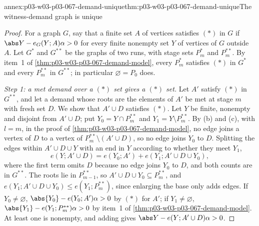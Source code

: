 \begin{annexitem}{annex:p03-w03-p03-067-demand-unique}{thm:p03-w03-p03-067-demand-unique}{The witness-demand graph is unique}
\begin{proof}
For a graph \(G\), say that a finite set \(A\) of vertices satisfies
\((\ast)\) in \(G\) if \(\abs Y-e_G(Y;A)\alpha>0\) for every finite nonempty
set \(Y\) of vertices of \(G\) outside \(A\).  Let \(G^\ast\) and \(G^{\ast\ast}\)
be the graphs of two runs, with stage sets \(P^\ast_m\) and
\(P^{\ast\ast}_m\).  By item~1 of \cref{thm:p03-w03-p03-067-demand-model},
every \(P^\ast_m\) satisfies \((\ast)\) in \(G^\ast\) and every
\(P^{\ast\ast}_m\) in \(G^{\ast\ast}\); in particular \(\varnothing=P_0\) does.

\emph{Step 1: a met demand over a \((\ast)\) set gives a \((\ast)\) set.}  Let
\(A'\) satisfy \((\ast)\) in \(G^{\ast\ast}\), and let a demand whose roots
are the elements of \(A'\) be met at stage \(m\) with fresh set \(D\).  We
show that \(A'\cup D\) satisfies \((\ast)\).  Let \(Y\) be finite, nonempty
and disjoint from \(A'\cup D\); put \(Y_0=Y\cap P^{\ast\ast}_m\) and
\(Y_1=Y\setminus P^{\ast\ast}_m\).  By (b) and (c), with \(l=m\), in the proof of
\cref{thm:p03-w03-p03-067-demand-model}, no edge joins a vertex of \(D\) to a
vertex of \(P^{\ast\ast}_m\setminus(A'\cup D)\), so no edge joins \(Y_0\) to
\(D\).  Splitting the edges within \(A'\cup D\cup Y\) with an end in \(Y\)
according to whether they meet \(Y_1\),
\[
 e(Y;A'\cup D)=e(Y_0;A')+e(Y_1;A'\cup D\cup Y_0),
\]
where the first term omits \(D\) because no edge joins \(Y_0\) to \(D\), and
both counts are in \(G^{\ast\ast}\).  The roots lie in
\(P^{\ast\ast}_{m-1}\), so \(A'\cup D\cup Y_0\subseteq P^{\ast\ast}_m\), and
\(e(Y_1;A'\cup D\cup Y_0)\leq e(Y_1;P^{\ast\ast}_m)\), since enlarging the
base only adds edges.  If \(Y_0\neq\varnothing\),
\(\abs{Y_0}-e(Y_0;A')\alpha>0\) by \((\ast)\) for \(A'\); if
\(Y_1\neq\varnothing\), \(\abs{Y_1}-e(Y_1;P^{\ast\ast}_m)\alpha>0\) by
item~1 of \cref{thm:p03-w03-p03-067-demand-model}.  At least one is
nonempty, and adding gives \(\abs Y-e(Y;A'\cup D)\alpha>0\).


\end{proof}
\end{annexitem}

